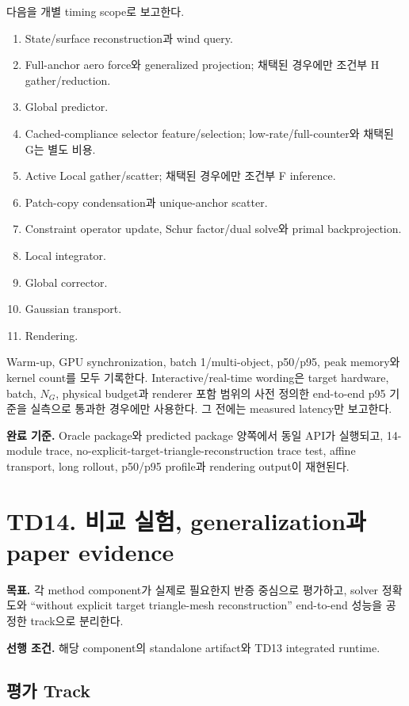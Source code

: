 \documentclass[10pt,a4paper]{article}
\begin{document}
다음을 개별 timing scope로 보고한다.

\begin{enumerate}
  \item State/surface reconstruction과 wind query.
  \item Full-anchor aero force와 generalized projection; 채택된 경우에만 조건부 H gather/reduction.
  \item Global predictor.
  \item Cached-compliance selector feature/selection; low-rate/full-counter와 채택된 G는 별도 비용.
  \item Active Local gather/scatter; 채택된 경우에만 조건부 F inference.
  \item Patch-copy condensation과 unique-anchor scatter.
  \item Constraint operator update, Schur factor/dual solve와 primal backprojection.
  \item Local integrator.
  \item Global corrector.
  \item Gaussian transport.
  \item Rendering.
\end{enumerate}

Warm-up, GPU synchronization, batch 1/multi-object, p50/p95, peak memory와 kernel count를 모두 기록한다.
Interactive/real-time wording은 target hardware, batch, \(N_G\), physical budget과 renderer 포함 범위의
사전 정의한 end-to-end p95 기준을 실측으로 통과한 경우에만 사용한다.
그 전에는 measured latency만 보고한다.

\textbf{완료 기준.}
Oracle package와 predicted package 양쪽에서 동일 API가 실행되고,
14-module trace, no-explicit-target-triangle-reconstruction trace test, affine transport,
long rollout, p50/p95 profile과 rendering output이 재현된다.

\section{TD14. 비교 실험, generalization과 paper evidence}

\textbf{목표.}
각 method component가 실제로 필요한지 반증 중심으로 평가하고,
solver 정확도와 ``without explicit target triangle-mesh reconstruction'' end-to-end 성능을 공정한 track으로 분리한다.

\textbf{선행 조건.} 해당 component의 standalone artifact와 TD13 integrated runtime.

\subsection*{평가 Track}
\end{document}
